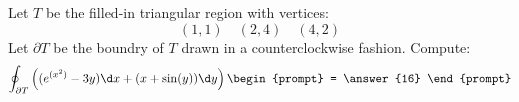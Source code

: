 \documentclass{ximera}
\begin{document}
\begin{exercise}
  Let $T$ be the filled-in triangular region with vertices:
  \[
  (1,1)\quad (2,4)\quad (4,2) 
  \]
  Let $\partial T$ be the boundry of $T$ drawn in a counterclockwise
  fashion. Compute:
  \[
  \oint_{\partial T} \left( (e^{(x^2)}-3y)\d x + (x+\sin(y))\d y\right)
  \begin{prompt}
    = \answer{16}
  \end{prompt}
  \]
\end{exercise}
\end{document}
